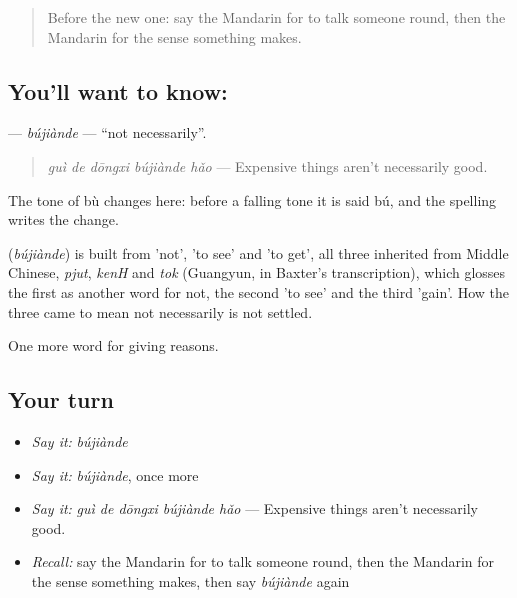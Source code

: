 \label{lesson:ZH-C353-bujiande}



\begin{quote}
Before the new one: say the Mandarin for to talk someone round, then the Mandarin for the sense something makes.
\end{quote}

\subsection*{You'll want to know: }
\textbf{} — \emph{bújiànde} — \textquotedblleft{}not necessarily\textquotedblright{}.

\begin{quote}
\emph{guì de dōngxi bújiànde hǎo} — Expensive things aren't necessarily good.
\end{quote}

The tone of bù changes here: before a falling tone it is said bú, and the spelling writes the change.

\begin{cousinweb}
\textbf{} (\emph{bújiànde}) is built from  'not',  'to see' and  'to get', all three inherited from Middle Chinese, \emph{pjut}, \emph{kenH} and \emph{tok} (Guangyun, in Baxter's transcription), which glosses the first as another word for not, the second 'to see' and the third 'gain'. How the three came to mean not necessarily is not settled.
\end{cousinweb}

\begin{grammarlens}[title={What you've built}]
One more word for giving reasons.
\end{grammarlens}

\subsection*{Your turn}
\begin{itemize}
\raggedright
  \item \emph{Say it:} \emph{bújiànde}
  \item \emph{Say it:} \emph{bújiànde}, once more
  \item \emph{Say it:} \emph{guì de dōngxi bújiànde hǎo} — Expensive things aren't necessarily good.
  \item \emph{Recall:} say the Mandarin for to talk someone round, then the Mandarin for the sense something makes, then say \emph{bújiànde} again
\end{itemize}

